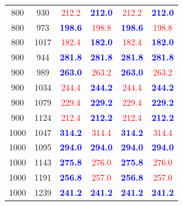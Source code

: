 \begin{tabular}{|c|c|c|c|c|c|}
800 & 930 & \textcolor{red}{212.2} & \textbf{\textcolor{blue}{212.0}} & \textcolor{red}{212.2} & \textbf{\textcolor{blue}{212.0}}\\
800 & 973 & \textbf{\textcolor{blue}{198.6}} & \textcolor{red}{198.8} & \textbf{\textcolor{blue}{198.6}} & \textcolor{red}{198.8}\\
800 & 1017 & \textcolor{red}{182.4} & \textbf{\textcolor{blue}{182.0}} & \textcolor{red}{182.4} & \textbf{\textcolor{blue}{182.0}}\\
900 & 944 & \textbf{\textcolor{blue}{281.8}} & \textbf{\textcolor{blue}{281.8}} & \textbf{\textcolor{blue}{281.8}} & \textbf{\textcolor{blue}{281.8}}\\
900 & 989 & \textbf{\textcolor{blue}{263.0}} & \textcolor{red}{263.2} & \textbf{\textcolor{blue}{263.0}} & \textcolor{red}{263.2}\\
900 & 1034 & \textcolor{red}{244.4} & \textbf{\textcolor{blue}{244.2}} & \textcolor{red}{244.4} & \textbf{\textcolor{blue}{244.2}}\\
900 & 1079 & \textcolor{red}{229.4} & \textbf{\textcolor{blue}{229.2}} & \textcolor{red}{229.4} & \textbf{\textcolor{blue}{229.2}}\\
900 & 1124 & \textcolor{red}{212.4} & \textbf{\textcolor{blue}{212.2}} & \textcolor{red}{212.4} & \textbf{\textcolor{blue}{212.2}}\\
1000 & 1047 & \textbf{\textcolor{blue}{314.2}} & \textcolor{red}{314.4} & \textbf{\textcolor{blue}{314.2}} & \textcolor{red}{314.4}\\
1000 & 1095 & \textbf{\textcolor{blue}{294.0}} & \textbf{\textcolor{blue}{294.0}} & \textbf{\textcolor{blue}{294.0}} & \textbf{\textcolor{blue}{294.0}}\\
1000 & 1143 & \textbf{\textcolor{blue}{275.8}} & \textcolor{red}{276.0} & \textbf{\textcolor{blue}{275.8}} & \textcolor{red}{276.0}\\
1000 & 1191 & \textbf{\textcolor{blue}{256.8}} & \textcolor{red}{257.0} & \textbf{\textcolor{blue}{256.8}} & \textcolor{red}{257.0}\\
1000 & 1239 & \textbf{\textcolor{blue}{241.2}} & \textbf{\textcolor{blue}{241.2}} & \textbf{\textcolor{blue}{241.2}} & \textbf{\textcolor{blue}{241.2}}\\
\hline
\end{tabular}